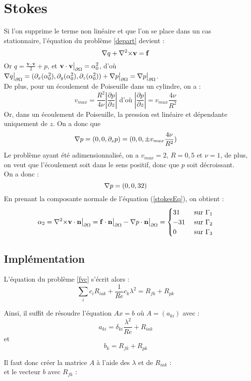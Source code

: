 \section{Stokes}
\label{stokes}
Si l'on supprime le terme non linéaire et que l'on se place dans un cas stationnaire, l'équation du problème \ref{depart} devient :
\begin{equation}\label{stokesEq} {\nabla} q + {\nabla^2\times}\mathbf{v} = \mathbf{f} \end{equation}
Or $q = \frac{\mathbf{v}\cdot\mathbf{v}}{2} + p$, et $\mathbf{v}\cdot\mathbf{v}{\big\rvert_{\partial\Omega}}=\alpha_0^2$, d'où ${\nabla} q{\big\rvert_{\partial\Omega}} = (\partial_x(\alpha_0^2), \partial_y(\alpha_0^2), \partial_z(\alpha_0^2)) + {\nabla} p{\big\rvert_{\partial\Omega}} =  {\nabla} p{\big\rvert_{\partial\Omega}}$.\\
De plus, pour un écoulement de Poiseuille dans un cylindre, on a : \[ v_{max} = \frac{R^2}{4\nu}\left\lvert\frac{\partial p}{\partial z}\right\rvert \mbox{ d'où } \left\lvert\frac{\partial p}{\partial z}\right\rvert = v_{max}\frac{4\nu}{R^2} \]
Or, dans un écoulement de Poiseuille, la pression est linéaire et dépendante uniquement de $z$. On a donc que \[ {\nabla} p = ( 0, 0, \partial_z p) = (0,0,\pm v_{max}\frac{4\nu}{R^2}) \]
Le problème ayant été adimensionnalisé, on a $v_{max}=2,\, R=0,5\mbox{ et } \nu=1$, de plus, on veut que l'écoulement soit dans le sens positif, donc que $p$ soit décroissant.\\
On a donc :
\[ {\nabla} p = (0,0, 32) \]
En prenant la composante normale de l'équation (\ref{stokesEq}), on obtient :
\[ \alpha_2 = {\nabla^2\times}\mathbf{v}\cdot\mathbf{n}{\big\rvert_{\partial\Omega}} = \mathbf{f}\cdot\mathbf{n}{\big\rvert_{\partial\Omega}} - {\nabla} p\cdot\mathbf{n}{\big\rvert_{\partial\Omega}} = \begin{cases} 31 & \mbox{ sur } \Gamma_1\\ -31 & \mbox{ sur } \Gamma_2\\ 0 & \mbox{ sur }\Gamma_3\end{cases} \]

\subsection{Implémentation}
L'équation du problème \ref{fvc} s'écrit alors :
\[ \sum_i c_iR_{iak} +\frac{1}{Re}c_k\lambda^2 = R_{fk} + R_{pk} \]

Ainsi, il suffit de résoudre l'équation $Ax=b$ où $A=(a_{ki})$ avec :
\[ a_{ki} = \delta_{ki}\frac{\lambda^2}{Re} + R_{iak} \]
et
\[ b_k = R_{fk} + R_{pk} \]

Il faut donc créer la matrice $A$ à l'aide des $\lambda$ et de $R_{iak}$ :\\

et le vecteur $b$ avec $R_{fk}$ :\\


